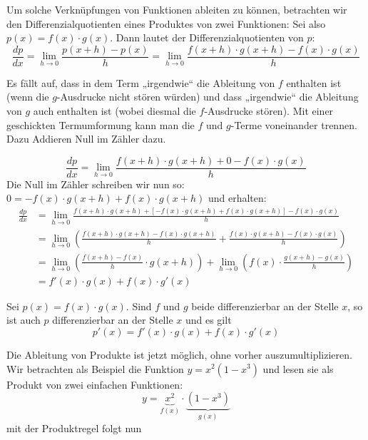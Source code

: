 Um solche Verknüpfungen von Funktionen ableiten zu können, betrachten wir den Differenzialquotienten eines Produktes von zwei Funktionen: Sei also $p(x)=f(x)\cdot g(x)$. Dann lautet der Differenzialquotienten von $p$:
$$\frac{dp}{dx}=\lim_{h\rightarrow 0} \frac{p(x+h)-p(x)}{h} = \lim_{h\rightarrow 0}\frac{f(x+h)\cdot g(x+h) - f(x)\cdot g(x)}{h}$$


Es fällt auf, dass in dem Term „irgendwie“ die Ableitung von $f$ enthalten ist (wenn die $g$-Ausdrucke nicht stören würden) und dass „irgendwie“ die Ableitung von $g$ auch enthalten ist (wobei diesmal die $f$-Ausdrucke stören). Mit einer geschickten Termumformung kann man die $f$ und $g$-Terme voneinander trennen. Dazu Addieren Null im Zähler dazu.

$$\frac{dp}{dx}=\lim_{h\rightarrow 0}\frac{f(x+h)\cdot g(x+h) + 0 - f(x)\cdot g(x)}{h}$$
Die Null im Zähler schreiben wir nun so: $0=-f(x)\cdot g(x+h)+f(x)\cdot g(x+h)$ und erhalten:
\begin{align*}
    \frac{dp}{dx} & = \lim_{h\rightarrow 0}\frac{f(x+h)\cdot g(x+h) + [-f(x)\cdot g(x+h)+f(x)\cdot g(x+h)] - f(x)\cdot g(x)}{h}                                  \\
                  & =  \lim_{h\rightarrow 0} \left(\frac{f(x+h)\cdot g(x+h)-f(x)\cdot g(x+h)}{h} + \frac{f(x)\cdot g(x+h)-f(x)\cdot g(x)}{h}\right)              \\
                  & = \lim_{h\rightarrow 0} \left(\frac{f(x+h)-f(x)}{h}\cdot g(x+h)\right) + \lim_{h\rightarrow 0} \left(f(x) \cdot \frac{g(x+h)-g(x)}{h}\right) \\
                  & =f'(x)\cdot g(x) + f(x)\cdot g'(x)
\end{align*}
\begin{theo}
    {}
    Sei $p(x)=f(x)\cdot g(x)$. Sind $f$ und $g$ beide differenzierbar an der Stelle $x$, so ist auch $p$ differenzierbar an der Stelle $x$ und es gilt
    $$p'(x)=f'(x) \cdot g(x)+f(x)\cdot g' (x)$$

\end{theo}

\begin{example}
    Die Ableitung von Produkte ist jetzt möglich, ohne vorher auszumultiplizieren. Wir betrachten als Beispiel die Funktion $y=x^2(1-x^3)$ und lesen sie als Produkt von zwei einfachen Funktionen:
    $$y=\underbrace{x^2}_{f(x)} \cdot \underbrace{(1-x^3)}_{g(x)}$$
    mit der Produktregel folgt nun
\end{example}

